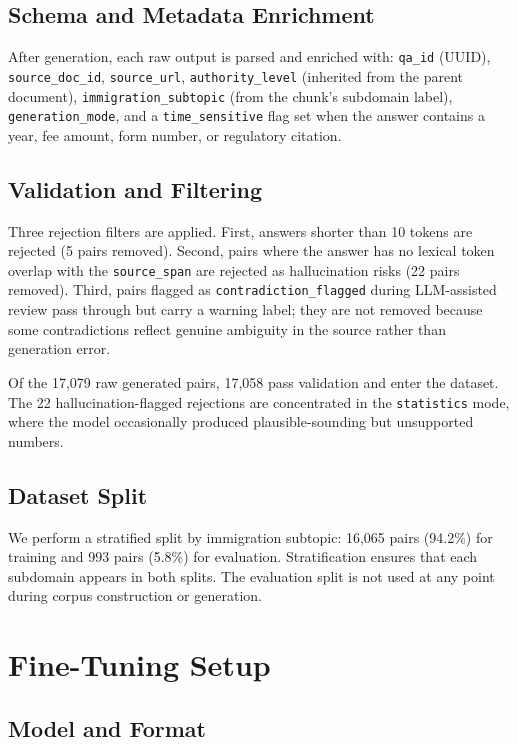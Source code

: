 \documentclass[11pt]{article}
\begin{document}
\subsection{Schema and Metadata Enrichment}

After generation, each raw output is parsed and enriched with: \texttt{qa\_id} (UUID), \texttt{source\_doc\_id}, \texttt{source\_url}, \texttt{authority\_level} (inherited from the parent document), \texttt{immi\-gration\_sub\-topic} (from the chunk's subdomain label), \texttt{generation\_mode}, and a \texttt{time\_sensitive} flag set when the answer contains a year, fee amount, form number, or regulatory citation.

\subsection{Validation and Filtering}

Three rejection filters are applied. First, answers shorter than 10 tokens are rejected (5 pairs removed). Second, pairs where the answer has no lexical token overlap with the \texttt{source\_span} are rejected as hallucination risks (22 pairs removed). Third, pairs flagged as \texttt{contradiction\_flagged} during LLM-assisted review pass through but carry a warning label; they are not removed because some contradictions reflect genuine ambiguity in the source rather than generation error.

Of the 17,079 raw generated pairs, 17,058 pass validation and enter the dataset. The 22 hallucination-flagged rejections are concentrated in the \texttt{statistics} mode, where the model occasionally produced plausible-sounding but unsupported numbers.

\subsection{Dataset Split}

We perform a stratified split by immigration subtopic: 16,065 pairs (94.2\%) for training and 993 pairs (5.8\%) for evaluation. Stratification ensures that each subdomain appears in both splits. The evaluation split is not used at any point during corpus construction or generation.

\section{Fine-Tuning Setup}
\label{sec:finetuning}

\subsection{Model and Format}
\end{document}
